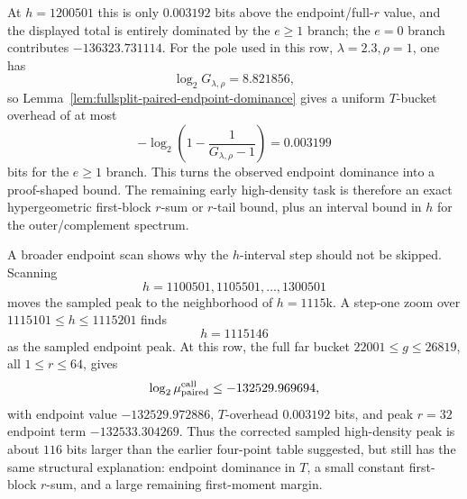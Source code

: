 At \(h=1200501\) this is only \(0.003192\) bits above the endpoint/full-\(r\) value, and the displayed total is
entirely dominated by the \(e\ge1\) branch; the \(e=0\) branch contributes \(-136323.731114\).  For the pole used in
this row, \(\lambda=2.3,\rho=1\), one has
\[
\log_2 G_{\lambda,\rho}=8.821856,
\]
so Lemma~\ref{lem:fullsplit-paired-endpoint-dominance} gives a uniform \(T\)-bucket overhead of at most
\[
-\log_2\left(1-\frac{1}{G_{\lambda,\rho}-1}\right)=0.003199
\]
bits for the \(e\ge1\) branch.  This turns the observed endpoint dominance into a proof-shaped bound.  The remaining
early high-density task is therefore an exact hypergeometric first-block \(r\)-sum or \(r\)-tail bound, plus an interval
bound in \(h\) for the outer/complement spectrum.

A broader endpoint scan shows why the \(h\)-interval step should not be skipped.  Scanning
\[
h=1100501,1105501,\ldots,1300501
\]
moves the sampled peak to the neighborhood of \(h=1115\)k.  A step-one zoom over \(1115101\le h\le1115201\) finds
\[
h=1115146
\]
as the sampled endpoint peak.  At this row, the full far bucket \(22001\le g\le26819\), all \(1\le r\le64\), gives
\[
\log_2\mu_{\rm paired}^{\rm eall}\le -132529.969694,
\]
with endpoint value \(-132529.972886\), \(T\)-overhead \(0.003192\) bits, and peak \(r=32\) endpoint term
\(-132533.304269\).  Thus the corrected sampled high-density peak is about \(116\) bits larger than the earlier
four-point table suggested, but still has the same structural explanation: endpoint dominance in \(T\), a small
constant first-block \(r\)-sum, and a large remaining first-moment margin.


